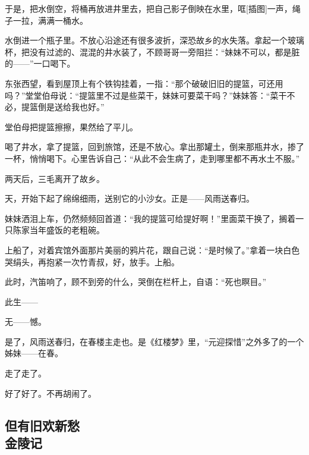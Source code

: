 \par 于是，把水倒空，将桶再放进井里去，把自己影子倒映在水里，哐[插图]一声，绳子一拉，满满一桶水。
\par 水倒进一个瓶子里。不放心沿途还有很多波折，深恐故乡的水失落。拿起一个玻璃杯，把没有过滤的、混混的井水装了，不顾哥哥一旁阻拦：“妹妹不可以，都是脏的——”一口喝下。
\par 东张西望，看到屋顶上有个铁钩挂着，一指：“那个破破旧旧的提篮，可还用吗？”堂堂伯母说：“提篮里不过是些菜干，妹妹可要菜干吗？”妹妹答：“菜干不必，提篮倒是送给我也好。”
\par 堂伯母把提篮擦擦，果然给了平儿。
\par 喝了井水，拿了提篮，回到旅馆，还是不放心。拿出那罐土，倒来那瓶井水，掺了一杯，悄悄喝下。心里告诉自己：“从此不会生病了，走到哪里都不再水土不服。”
\par 两天后，三毛离开了故乡。
\par 天，开始下起了绵绵细雨，送别它的小沙女。正是——风雨送春归。
\par 妹妹洒泪上车，仍然频频回首道：“我的提篮可给提好啊！”里面菜干换了，搁着一只陈家当年盛饭的老粗碗。
\par 上船了，对着宾馆外面那片美丽的鸦片花，跟自己说：“是时候了。”拿着一块白色哭绢头，再抱紧一次竹青叔，好，放手。上船。
\par 此时，汽笛响了，顾不到旁的什么，哭倒在栏杆上，自语：“死也瞑目。”
\par 此生——
\par 无——憾。
\par 是了，风雨送春归，在春楼主走也。是《红楼梦》里，“元迎探惜”之外多了的一个姊妹——在春。
\par 走了走了。
\par 好了好了。不再胡闹了。


\subsection{但有旧欢新愁\\\small{金陵记}}

